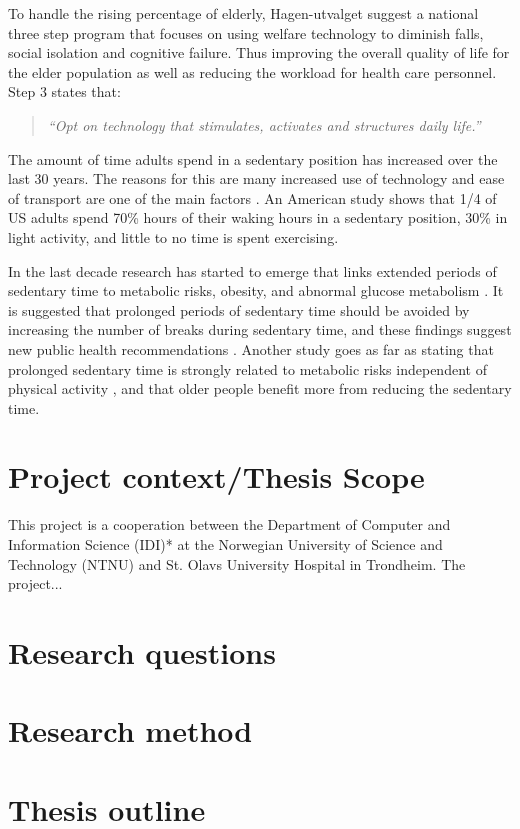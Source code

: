 To handle the rising percentage of elderly, Hagen-utvalget suggest a national three step program that focuses on using welfare technology to diminish falls, social isolation and cognitive failure. Thus improving the overall quality of life for the elder population as well as reducing the workload for health care personnel. 
Step 3 states that:
\begin{quote}
\textit{``Opt on technology that stimulates, activates and structures daily life.''}
\end{quote}

The amount of time adults spend in a sedentary position has increased over the last 30 years. The reasons for this are many increased use of technology and ease of transport are one of the main factors \cite{sedentaryBehaviour}. An American study shows that 1/4 of US adults spend 70\% hours of their waking hours in a sedentary position, 30\% in light activity, and little to no time is spent exercising.

In the last decade research has started to emerge that links extended periods of sedentary time to metabolic risks\cite{sedentaryTime}, obesity, and abnormal glucose metabolism \cite{breaksSedentary}. It is suggested that prolonged periods of sedentary time should be avoided by increasing the number of breaks during sedentary time, and these findings suggest new public health recommendations \cite{breaksSedentary}. Another study goes as far as stating that prolonged sedentary time is strongly related to metabolic risks independent of physical activity \cite{sedentaryActivity}, and that older people benefit more from reducing the sedentary time.



\section{Project context/Thesis Scope}
This project is a cooperation between the Department of Computer and Information Science (IDI)* at the Norwegian University of Science and Technology (NTNU) and St. Olavs University Hospital in Trondheim. The project...

\section{Research questions}



\section{Research method}

\section{Thesis outline}

